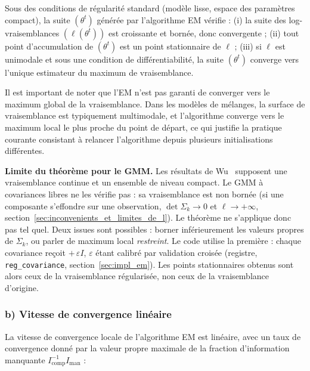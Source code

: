 \begin{theoreme}[Convergence de l'EM]\label{thm:wu}
Sous des conditions de régularité standard (modèle lisse, espace des paramètres compact), la suite $(\theta^{t})$ générée par l'algorithme EM vérifie : (i) la suite des log-vraisemblances $(\ell(\theta^{t}))$ est croissante et bornée, donc convergente ; (ii) tout point d'accumulation de $(\theta^{t})$ est un point stationnaire de $\ell$ ; (iii) si $\ell$ est unimodale et sous une condition de différentiabilité, la suite $(\theta^{t})$ converge vers l'unique estimateur du maximum de vraisemblance.
\end{theoreme}

Il est important de noter que l'EM n'est pas garanti de converger vers le maximum global de la vraisemblance. Dans les modèles de mélanges, la surface de vraisemblance est typiquement multimodale, et l'algorithme converge vers le maximum local le plus proche du point de départ, ce qui justifie la pratique courante consistant à relancer l'algorithme depuis plusieurs initialisations différentes.

\textbf{Limite du théorème pour le GMM. }Les résultats de Wu~\cite{wu1983} supposent une vraisemblance continue et un ensemble de niveau compact. Le GMM à covariances libres ne les vérifie pas : sa vraisemblance est non bornée (si une composante s'effondre sur une observation, $\det\Sigma_k \to 0$ et $\ell \to +\infty$, section~\ref{sec:inconvenients_et_limites_de_l}). Le théorème ne s'applique donc pas tel quel. Deux issues sont possibles : borner inférieurement les valeurs propres de $\Sigma_k$, ou parler de maximum local \emph{restreint}. Le code utilise la première : chaque covariance reçoit $+\,\varepsilon I$, $\varepsilon$ étant calibré par validation croisée (registre, \texttt{reg\_covariance}, section~\ref{sec:impl_em}). Les points stationnaires obtenus sont alors ceux de la vraisemblance régularisée, non ceux de la vraisemblance d'origine.

\subsubsection{b) Vitesse de convergence linéaire}\label{sec:b_vitesse_de_convergence_lineaire}
La vitesse de convergence locale de l'algorithme EM est linéaire, avec un taux de convergence donné par la valeur propre maximale de la fraction d'information manquante $I_{\text{comp}}^{-1} I_{\text{man}}$ :

